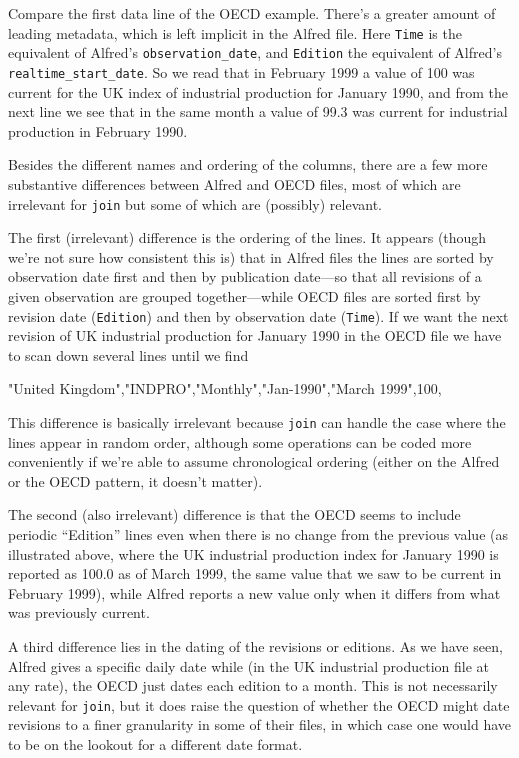 Compare the first data line of the OECD example. There's a greater
amount of leading metadata, which is left implicit in the Alfred
file. Here \texttt{Time} is the equivalent of Alfred's
\verb|observation_date|, and \texttt{Edition} the equivalent of
Alfred's \verb|realtime_start_date|. So we read that in February 1999
a value of 100 was current for the UK index of industrial production
for January 1990, and from the next line we see that in the same month
a value of 99.3 was current for industrial production in February
1990.

Besides the different names and ordering of the columns, there are a
few more substantive differences between Alfred and OECD files, most
of which are irrelevant for \texttt{join} but some of which are
(possibly) relevant.

The first (irrelevant) difference is the ordering of the lines. It
appears (though we're not sure how consistent this is) that in Alfred
files the lines are sorted by observation date first and then by
publication date---so that all revisions of a given observation are
grouped together---while OECD files are sorted first by revision date
(\texttt{Edition}) and then by observation date (\texttt{Time}). If we
want the next revision of UK industrial production for January 1990 in
the OECD file we have to scan down several lines until we find
\begin{code}
"United Kingdom","INDPRO","Monthly","Jan-1990","March 1999",100,
\end{code}
This difference is basically irrelevant because \texttt{join} can
handle the case where the lines appear in random order, although some
operations can be coded more conveniently if we're able to assume
chronological ordering (either on the Alfred or the OECD pattern, it
doesn't matter).

The second (also irrelevant) difference is that the OECD seems to
include periodic ``Edition'' lines even when there is no change from
the previous value (as illustrated above, where the UK industrial
production index for January 1990 is reported as 100.0 as of March
1999, the same value that we saw to be current in February 1999),
while Alfred reports a new value only when it differs from what was
previously current.

A third difference lies in the dating of the revisions or editions.
As we have seen, Alfred gives a specific daily date while (in the UK
industrial production file at any rate), the OECD just dates each
edition to a month. This is not necessarily relevant for
\texttt{join}, but it does raise the question of whether the OECD
might date revisions to a finer granularity in some of their files, in
which case one would have to be on the lookout for a different date
format.


